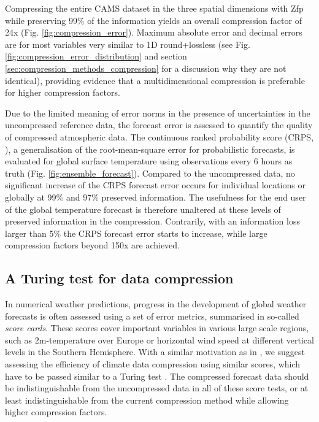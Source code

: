 Compressing the entire CAMS dataset in the three spatial dimensions with Zfp while preserving 99\% of the information yields
an overall compression factor of 24x (Fig. \ref{fig:compression_error}). Maximum absolute error and decimal errors are for
most variables very similar to 1D round+lossless (see Fig. \ref{fig:compression_error_distribution} and section
\ref{sec:compression_methods_compression} for a discussion why they are not identical), providing evidence that a
multidimensional compression is preferable for higher compression factors. 

Due to the limited meaning of error norms in the presence of uncertainties in the uncompressed reference data, the forecast
error is assessed to quantify the quality of compressed atmospheric data. The continuous ranked probability score
(CRPS, \cite{Matheson1976,Hersbach2000,Zamo2018}),
a generalisation of the root-mean-square error for probabilistic forecasts, is evaluated for global surface temperature using observations
every 6 hours as truth (Fig. \ref{fig:ensemble_forecast}). Compared to the uncompressed data, no significant increase of the CRPS forecast error 
occurs for individual locations or globally at 99\% and 97\% preserved information. The usefulness for the end user of the global temperature
forecast is therefore unaltered at these levels of preserved information in the compression. Contrarily, with an information loss larger than
5\% the CRPS forecast error starts to increase, while large compression factors beyond 150x are achieved.

\subsection{A Turing test for data compression}

In numerical weather predictions, progress in the development of global weather forecasts is often assessed using a set of error metrics,
summarised in so-called \emph{score cards}. These scores cover important variables in various large scale regions, such as 2m-temperature
over Europe or horizontal wind speed at different vertical levels in the Southern Hemisphere. With a similar motivation as in \cite{Baker2019},
we suggest assessing the efficiency of climate data compression using similar scores, which have to be passed similar to a Turing test
\citep{Baker2016,Turing1950}.
The compressed forecast data should be indistinguishable from the uncompressed data in all of these score tests, or at least indistinguishable
from the current compression method while allowing higher compression factors. 

